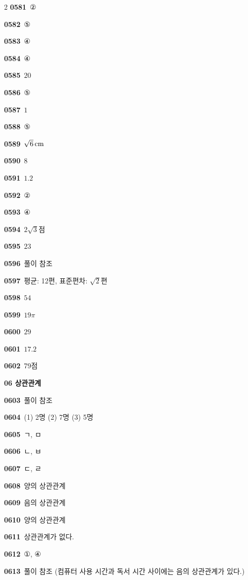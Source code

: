 \documentclass[10pt,a4paper]{article}
\begin{document}
\begin{multicols}{2}
\noindent\textbf{0581}\ ②\par
\noindent\textbf{0582}\ ⑤\par
\noindent\textbf{0583}\ ④\par
\noindent\textbf{0584}\ ④\par
\noindent\textbf{0585}\ $20$\par
\noindent\textbf{0586}\ ⑤\par
\noindent\textbf{0587}\ $1$\par
\noindent\textbf{0588}\ ⑤\par
\noindent\textbf{0589}\ $\sqrt{6}\mkern3mu \mathrm{cm}$\par
\noindent\textbf{0590}\ $8$\par
\noindent\textbf{0591}\ $1.2$\par
\noindent\textbf{0592}\ ②\par
\noindent\textbf{0593}\ ④\par
\noindent\textbf{0594}\ $2\sqrt{3}$점\par
\noindent\textbf{0595}\ $23$\par
\noindent\textbf{0596}\ 풀이 참조\par
\noindent\textbf{0597}\ 평균: 12편, 표준편차: $\sqrt{2}$편\par
\noindent\textbf{0598}\ $54$\par
\noindent\textbf{0599}\ $19\pi$\par
\noindent\textbf{0600}\ $29$\par
\noindent\textbf{0601}\ $17.2$\par
\noindent\textbf{0602}\ 79점\par
\noindent\textbf{06 상관관계}\par\smallskip
\noindent\textbf{0603}\ 풀이 참조\par
\noindent\textbf{0604}\ (1) 2명 (2) 7명 (3) 5명\par
\noindent\textbf{0605}\ ㄱ, ㅁ\par
\noindent\textbf{0606}\ ㄴ, ㅂ\par
\noindent\textbf{0607}\ ㄷ, ㄹ\par
\noindent\textbf{0608}\ 양의 상관관계\par
\noindent\textbf{0609}\ 음의 상관관계\par
\noindent\textbf{0610}\ 양의 상관관계\par
\noindent\textbf{0611}\ 상관관계가 없다.\par
\noindent\textbf{0612}\ ①, ④\par
\noindent\textbf{0613}\ 풀이 참조 (컴퓨터 사용 시간과 독서 시간 사이에는 음의 상관관계가 있다.)\par

\end{multicols}
\end{document}
